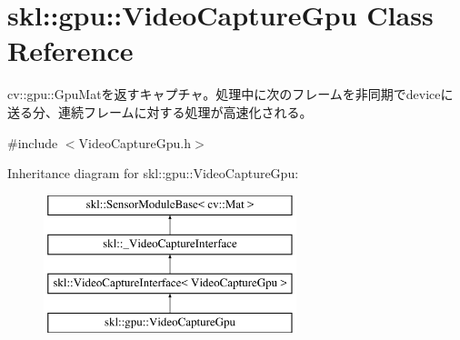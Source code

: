 \hypertarget{classskl_1_1gpu_1_1_video_capture_gpu}{}\section{skl\+:\+:gpu\+:\+:Video\+Capture\+Gpu Class Reference}
\label{classskl_1_1gpu_1_1_video_capture_gpu}


cv\+::gpu\+::\+Gpu\+Matを返すキャプチャ。処理中に次のフレームを非同期でdeviceに送る分、連続フレームに対する処理が高速化される。  




{\ttfamily \#include $<$Video\+Capture\+Gpu.\+h$>$}

Inheritance diagram for skl\+:\+:gpu\+:\+:Video\+Capture\+Gpu\+:\begin{figure}[H]
\begin{center}
\leavevmode
\includegraphics[height=4.000000cm]{classskl_1_1gpu_1_1_video_capture_gpu}
\end{center}
\end{figure}
